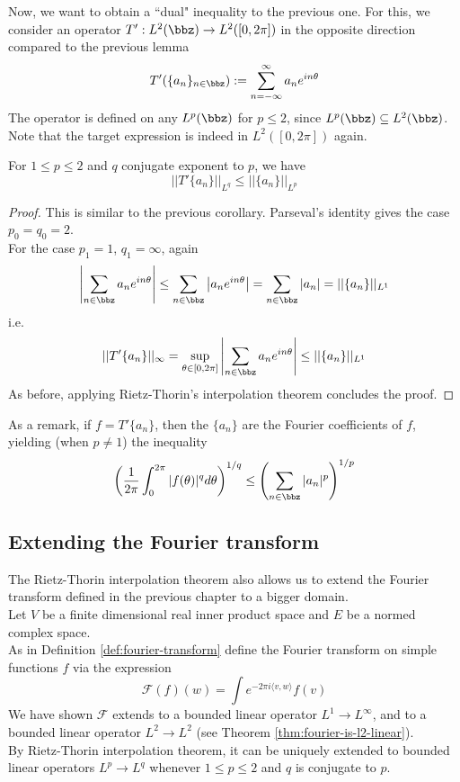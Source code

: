 Now, we want to obtain a ``dual" inequality to the previous one. For this, we consider an operator $T':L^2(\bbz) \to L^2([0, 2\pi])$ in the opposite direction compared to the previous lemma
\[ T' (\{a_n\}_{n\in \bbz}) := \sum_{n=-\infty}^{\infty} a_n e^{in\theta} \]
The operator is defined on any $L^p(\bbz)$ for $p\leq 2$, since $L^p(\bbz) \subseteq L^2(\bbz)$.
Note that the target expression is indeed in $L^2([0, 2\pi])$ again.

\begin{lemma}
    \label{lem:hausdorff_young_dual}
    \uses{}
    \lean{}
    For $1\leq p \leq 2$ and $q$ conjugate exponent to $p$, we have
    \[ ||T' \{a_n\}||_{L^q} \leq ||\{a_n\}||_{L^p} \]

    \end{lemma}
      \begin{proof}
      This is similar to the previous corollary. Parseval's identity gives the case $p_0=q_0=2$.\\
      For the case $p_1=1$, $q_1=\infty$, again
      \[ \left| \sum_{n\in \bbz} a_n e^{in\theta} \right| \leq \sum_{n\in \bbz} \left| a_n e^{in\theta} \right| = \sum_{n\in \bbz} |a_n| = ||\{a_n\}||_{L^1} \]
      i.e.
      \[ ||T'\{a_n\}||_{\infty} = \sup_{\theta \in [0, 2\pi]}  \left| \sum_{n\in \bbz} a_n e^{in\theta} \right| \leq ||\{a_n\}||_{L^1}  \]
      As before, applying Rietz-Thorin's interpolation theorem concludes the proof.
    \end{proof}

As a remark, if $f= T'\{a_n\}$, then the $\{a_n\}$ are the Fourier coefficients of $f$, yielding (when $p\neq 1$) the inequality
\[ \left( \frac{1}{2\pi} \int_0^{2\pi} |f(\theta)|^q d\theta \right)^{1/q} \leq \left( \sum_{n\in \bbz} |a_n|^p \right)^{1/p} \]

\subsection{Extending the Fourier transform}
The Rietz-Thorin interpolation theorem also allows us to extend the Fourier transform defined in the previous chapter to a bigger domain.\\
Let $V$ be a finite dimensional real inner product space and $E$ be a normed complex space.\\
As in Definition \ref{def:fourier-transform} define the Fourier transform on simple functions $f$ via the expression
\[ \mathcal{F} (f)(w) = \int e^{-2\pi i \langle v, w \rangle } f(v) \]
We have shown $\mathcal{F}$ extends to a bounded linear operator $L^1 \to L^{\infty}$, and to a bounded linear operator $L^2 \to L^2$ (see Theorem \ref{thm:fourier-is-l2-linear}).\\
By Rietz-Thorin interpolation theorem, it can be uniquely extended to bounded linear operators $L^p \to L^q$
whenever $1\leq p \leq 2$ and $q$ is conjugate to $p$.

